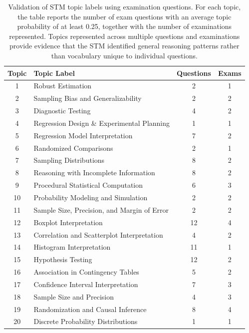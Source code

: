 \documentclass[APA,LATO2COL]{WileyNJDv5}
\begin{document}
\begin{table}[!ht]
\caption{Validation of STM topic labels using examination questions. For each topic, the table reports the number of exam questions with an average topic probability of at least 0.25, together with the number of examinations represented. Topics represented across multiple questions and examinations provide evidence that the STM identified general reasoning patterns rather than vocabulary unique to individual questions.}
\label{tab:topic_validation}
\centering
\small
\setlength{\tabcolsep}{3pt}
\begin{tabular}{clcc}
\toprule
\textbf{Topic} &
\textbf{Topic Label} &
\textbf{Questions} &
\textbf{Exams} \\
\midrule
1  & Robust Estimation               & 2  & 1 \\
2  & Sampling Bias and Generalizability                   & 2  & 2 \\
3  & Diagnostic Testing          & 4  & 2 \\
4  & Regression Design \& Experimental Planning       & 1  & 1 \\
5  & Regression Model Interpretation                      & 7  & 2 \\
6  & Randomized Comparisons            & 2  & 1 \\
7  & Sampling Distributions            & 8  & 2 \\
8  & Reasoning with Incomplete Information                & 8  & 2 \\
9  & Procedural Statistical Computation                   & 6  & 3 \\
10 & Probability Modeling and Simulation                  & 2  & 2 \\
11 & Sample Size, Precision, and Margin of Error          & 2  & 2 \\
12 & Boxplot Interpretation    & 12 & 4 \\
13 & Correlation and Scatterplot Interpretation           & 4  & 2 \\
14 & Histogram Interpretation      & 11 & 1 \\
15 & Hypothesis Testing    & 12 & 2 \\
16 & Association in Contingency Tables                    & 5  & 2 \\
17 & Confidence Interval Interpretation                   & 7  & 3 \\
18 & Sample Size and Precision                 & 4  & 3 \\
19 & Randomization and Causal Inference                   & 8  & 4 \\
20 & Discrete Probability Distributions                   & 1  & 1 \\
\bottomrule
\end{tabular}
\end{table}
\end{document}
